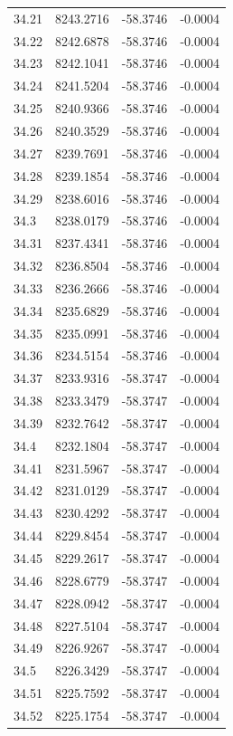 \begin{table}[H]
\begin{tabular}{llll}
34.21 & 8243.2716 & -58.3746 & -0.0004 \\
34.22 & 8242.6878 & -58.3746 & -0.0004 \\
34.23 & 8242.1041 & -58.3746 & -0.0004 \\
34.24 & 8241.5204 & -58.3746 & -0.0004 \\
34.25 & 8240.9366 & -58.3746 & -0.0004 \\
34.26 & 8240.3529 & -58.3746 & -0.0004 \\
34.27 & 8239.7691 & -58.3746 & -0.0004 \\
34.28 & 8239.1854 & -58.3746 & -0.0004 \\
34.29 & 8238.6016 & -58.3746 & -0.0004 \\
34.3 & 8238.0179 & -58.3746 & -0.0004 \\
34.31 & 8237.4341 & -58.3746 & -0.0004 \\
34.32 & 8236.8504 & -58.3746 & -0.0004 \\
34.33 & 8236.2666 & -58.3746 & -0.0004 \\
34.34 & 8235.6829 & -58.3746 & -0.0004 \\
34.35 & 8235.0991 & -58.3746 & -0.0004 \\
34.36 & 8234.5154 & -58.3746 & -0.0004 \\
34.37 & 8233.9316 & -58.3747 & -0.0004 \\
34.38 & 8233.3479 & -58.3747 & -0.0004 \\
34.39 & 8232.7642 & -58.3747 & -0.0004 \\
34.4 & 8232.1804 & -58.3747 & -0.0004 \\
34.41 & 8231.5967 & -58.3747 & -0.0004 \\
34.42 & 8231.0129 & -58.3747 & -0.0004 \\
34.43 & 8230.4292 & -58.3747 & -0.0004 \\
34.44 & 8229.8454 & -58.3747 & -0.0004 \\
34.45 & 8229.2617 & -58.3747 & -0.0004 \\
34.46 & 8228.6779 & -58.3747 & -0.0004 \\
34.47 & 8228.0942 & -58.3747 & -0.0004 \\
34.48 & 8227.5104 & -58.3747 & -0.0004 \\
34.49 & 8226.9267 & -58.3747 & -0.0004 \\
34.5 & 8226.3429 & -58.3747 & -0.0004 \\
34.51 & 8225.7592 & -58.3747 & -0.0004 \\
34.52 & 8225.1754 & -58.3747 & -0.0004 \\

\end{tabular}
\end{table}

